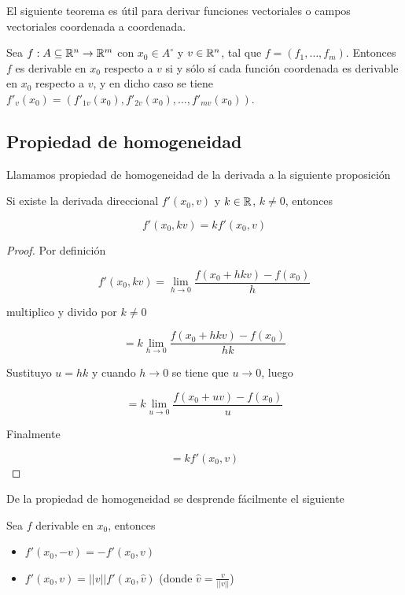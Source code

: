 El siguiente teorema es útil para derivar funciones vectoriales o campos vectoriales coordenada a coordenada.

\begin{theorem}
Sea $f: A \subseteq \mathbb{R}^n \to \mathbb{R}^m$ con $x_0 \in A^{\circ}$ y $v \in \mathbb{R}^n$, tal que $f = (f_1, \ldots, f_m)$.  Entonces $f$ es derivable en $x_0$ respecto a $v$ si y sólo sí cada función coordenada es derivable en $x_0$ respecto a $v$, y en dicho caso se tiene $f'_v(x_0) = (f'_{1v}(x_0), f'_{2v}(x_0), \ldots, f'_{mv}(x_0))$.
 \end{theorem}

\subsection{Propiedad de homogeneidad}

Llamamos propiedad de homogeneidad de la derivada a la siguiente proposición

\begin{proposition}[Homogeneidad] 
Si existe la derivada direccional $ f'(x_0, v)$ y $ k \in \mathbb{R}$, $ k \neq 0$, entonces 

$$ f'(x_0, kv) = k f'(x_0, v)$$
\end{proposition}

\begin{proof}
Por definición

$$ \displaystyle f'(x_0, kv) = \lim_{h \to 0} \frac{f(x_0 + hkv) - f(x_0)}{h} $$

multiplico y divido por $k \neq 0$

$$ \displaystyle = k \lim_{h \to 0} \frac{f(x_0 + hkv) - f(x_0)}{hk} $$

Sustituyo $ u = hk$ y cuando $ h \to 0$ se tiene que $ u \to 0$, luego

$$ \displaystyle = k \lim_{u \to 0} \frac{f(x_0 + uv) - f(x_0)}{u} $$

Finalmente

$$ \displaystyle = k f'(x_0, v) $$
\end{proof}

De la propiedad de homogeneidad se desprende fácilmente el siguiente

\begin{corollary}
Sea $f$ derivable en $x_0$, entonces
\begin{itemize}
\item $ f'(x_0, -v) = -f'(x_0, v)$
\item $ f'(x_0, v) = ||v||f'(x_0, \hat{v})$ (donde $ \hat{v} = \frac{v}{||v||}$)
\end{itemize}
\end{corollary}


